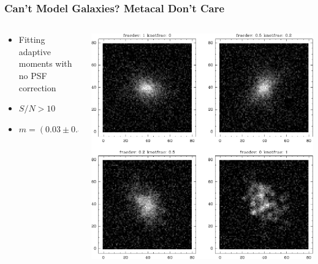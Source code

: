 \documentclass{beamer}
\newcommand{\snr}{$S/N$}
\begin{document}
\frame
{
    \frametitle{Can't Model Galaxies?  Metacal Don't Care}
 
 
    \begin{columns}
        \begin{column}{0.5\textwidth}
            \begin{itemize}
                \item Fitting {\color{lightsteelblue} adaptive moments} with 
                    {\color{red} no PSF correction}
                \item \snr$ > 10$
                \item {\color{gold}$m = (0.03 \pm 0.31) \times 10^{-3}$}
            \end{itemize}
        \end{column}
        \begin{column}{0.5\textwidth}
            \begin{center}
                \includegraphics[width=\columnwidth]{mosaic-009086.pdf}
                \newline
            \end{center}
        \end{column}
    \end{columns}


}
\end{document}

